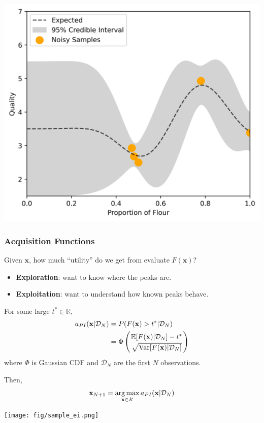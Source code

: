 \documentclass{beamer}
\begin{document}
\begin{frame}
    \includegraphics[width=\textwidth]{fig/sample_4.png}
\end{frame}

\begin{frame}
    \frametitle{Acquisition Functions}
    Given $\mathbf{x}$, how much ``utility'' do we get from evaluate $F(\mathbf{x})$?
    \begin{itemize}
        \item \textbf{Exploration}: want to know where the peaks are.
        \item \textbf{Exploitation}: want to understand how known peaks behave.
    \end{itemize}
\end{frame}

\begin{frame}
    \begin{definition}[PI]
        For some large $t^{*} \in \mathbb{R}$,
        \begin{align*}
            a_{PI}(\mathbf{x} | \mathcal{D}_N) & =
            P(F(\mathbf{x}) > t^{*} | \mathcal{D}_N) \\
            & = \Phi\left( \frac{ \mathbb{E}[F(\mathbf{x}) | \mathcal{D}_N] - t^{*} }{ \sqrt{\operatorname{Var}[F(\mathbf{x}) | \mathcal{D}_N] }}\right)
        \end{align*}
        where $\Phi$ is Gaussian CDF and $\mathcal{D}_N$ are the first $N$ observations.
    \end{definition}
    \pause
    Then,
    \begin{equation*}
        \mathbf{x}_{N + 1} = \operatorname*{arg\,max}_{\mathbf{x} \in \mathcal{X}} a_{PI}(\mathbf{x} | \mathcal{D}_{N})
    \end{equation*}
\end{frame}
\begin{frame}
    \texttt{[image: fig/sample\_ei.png]}
\end{frame}
\end{document}
